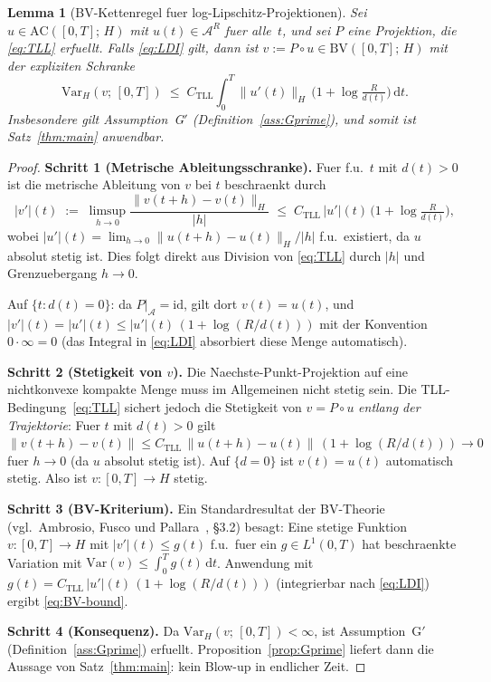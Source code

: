 \documentclass[12pt,a4paper]{article}
\theoremstyle{definition}
\theoremstyle{plain}
\newtheorem{lemma}[definition]{Lemma}
\theoremstyle{remark}
\begin{document}
\begin{lemma}[BV-Kettenregel fuer log-Lipschitz-Projektionen]
\label{lem:LL-BV}
Sei $u \in \mathrm{AC}([0,T];\,H)$ mit $u(t) \in \mathcal{A}^R$
fuer alle~$t$, und sei $P$ eine Projektion, die \eqref{eq:TLL} erfuellt.
Falls \eqref{eq:LDI} gilt, dann ist $v := P\circ u \in \mathrm{BV}([0,T];\,H)$
mit der expliziten Schranke
\begin{equation}\label{eq:BV-bound}
  \mathrm{Var}_H(v;\,[0,T])
  \;\le\;
  C_{\mathrm{TLL}}
  \int_0^T \|u'(t)\|_H\,
  \bigl(1 + \log\tfrac{R}{d(t)}\bigr)\,\mathrm{d}t.
\end{equation}
Insbesondere gilt Assumption~G$'$
\textup{(}Definition~\ref{ass:Gprime}\textup{)}, und somit ist
Satz~\ref{thm:main} anwendbar.
\end{lemma}

\begin{proof}
\textbf{Schritt 1 (Metrische Ableitungsschranke).}\;
Fuer f.u.\ $t$ mit $d(t)>0$ ist die metrische Ableitung von $v$ bei $t$
beschraenkt durch
\[
  |v'|(t)
  \;:=\;
  \limsup_{h\to 0}\frac{\|v(t+h)-v(t)\|_H}{|h|}
  \;\le\;
  C_{\mathrm{TLL}}\,|u'|(t)\,
  \bigl(1 + \log\tfrac{R}{d(t)}\bigr),
\]
wobei $|u'|(t) = \lim_{h\to 0}\|u(t+h)-u(t)\|_H/|h|$ f.u.\ existiert,
da $u$ absolut stetig ist. Dies folgt direkt aus Division von \eqref{eq:TLL}
durch $|h|$ und Grenzuebergang $h\to 0$.

Auf $\{t : d(t)=0\}$: da $P|_{\mathcal{A}} = \mathrm{id}$,
gilt dort $v(t) = u(t)$, und $|v'|(t) = |u'|(t) \le |u'|(t)\,
(1+\log(R/d(t)))$ mit der Konvention $0 \cdot \infty = 0$
(das Integral in \eqref{eq:LDI} absorbiert diese Menge automatisch).

\medskip
\noindent
\textbf{Schritt 2 (Stetigkeit von $v$).}\;
Die Naechste-Punkt-Projektion auf eine nichtkonvexe kompakte Menge muss
im Allgemeinen nicht stetig sein. Die TLL-Bedingung~\eqref{eq:TLL}
sichert jedoch die Stetigkeit von $v = P\circ u$ \emph{entlang der Trajektorie}:
Fuer $t$ mit $d(t) > 0$ gilt
$\|v(t+h)-v(t)\| \le C_{\mathrm{TLL}}\,\|u(t+h)-u(t)\|\,
(1+\log(R/d(t))) \to 0$ fuer $h \to 0$
(da $u$ absolut stetig ist). Auf $\{d=0\}$ ist $v(t)=u(t)$
automatisch stetig. Also ist $v: [0,T] \to H$ stetig.

\medskip
\noindent
\textbf{Schritt 3 (BV-Kriterium).}\;
Ein Standardresultat der BV-Theorie (vgl.\ Ambrosio, Fusco und
Pallara~\cite{AmbrosioFuscoPallara2000}, \S3.2) besagt: Eine stetige
Funktion $v: [0,T] \to H$ mit
$|v'|(t) \le g(t)$ f.u.\ fuer ein $g \in L^1(0,T)$ hat beschraenkte
Variation mit $\mathrm{Var}(v) \le \int_0^T g(t)\,\mathrm{d}t$.
Anwendung mit $g(t) = C_{\mathrm{TLL}}\,|u'|(t)\,
(1+\log(R/d(t)))$ (integrierbar nach \eqref{eq:LDI}) ergibt
\eqref{eq:BV-bound}.

\medskip
\noindent
\textbf{Schritt 4 (Konsequenz).}\;
Da $\mathrm{Var}_H(v;\,[0,T]) < \infty$, ist Assumption~G$'$
(Definition~\ref{ass:Gprime}) erfuellt.
Proposition~\ref{prop:Gprime} liefert dann die Aussage von
Satz~\ref{thm:main}: kein Blow-up in endlicher Zeit.
\end{proof}
\end{document}
